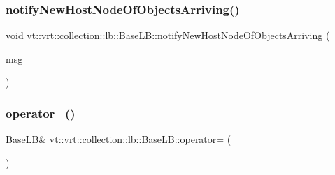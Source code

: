 \subsubsection{\texorpdfstring{notify\+New\+Host\+Node\+Of\+Objects\+Arriving()}{notifyNewHostNodeOfObjectsArriving()}}
{\footnotesize\ttfamily void vt\+::vrt\+::collection\+::lb\+::\+Base\+L\+B\+::notify\+New\+Host\+Node\+Of\+Objects\+Arriving (\begin{DoxyParamCaption}\item[{\hyperlink{structvt_1_1vrt_1_1collection_1_1lb_1_1_transfer_msg}{Transfer\+Msg}$<$ \hyperlink{structvt_1_1vrt_1_1collection_1_1lb_1_1_base_l_b_ae07370140db06e363398914895c5c728}{Obj\+Load\+List\+Type} $>$ $\ast$}]{msg }\end{DoxyParamCaption})}

\mbox{\label{structvt_1_1vrt_1_1collection_1_1lb_1_1_base_l_b_a94be0abcbc47bf6a3f3685f94dd5d4cb}} 
\subsubsection{\texorpdfstring{operator=()}{operator=()}\hspace{0.1cm}{\footnotesize\ttfamily [1/2]}}
{\footnotesize\ttfamily \hyperlink{structvt_1_1vrt_1_1collection_1_1lb_1_1_base_l_b}{Base\+LB}\& vt\+::vrt\+::collection\+::lb\+::\+Base\+L\+B\+::operator= (\begin{DoxyParamCaption}\item[{\hyperlink{structvt_1_1vrt_1_1collection_1_1lb_1_1_base_l_b}{Base\+LB} const \&}]{ }\end{DoxyParamCaption})\hspace{0.3cm}{\ttfamily [delete]}}

\mbox{\label{structvt_1_1vrt_1_1collection_1_1lb_1_1_base_l_b_a1e092a34c8e4eda0a05ab3a2f5a9ae45}} 
